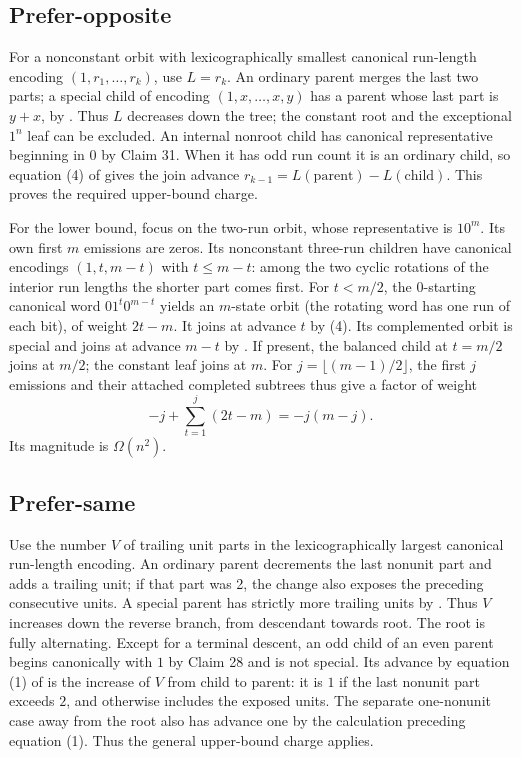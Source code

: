 \documentclass[11pt]{article}
\begin{document}
\subsection{Prefer-opposite}
For a nonconstant orbit with lexicographically smallest
canonical run-length encoding \((1,r_1,\ldots,r_k)\), use
\(L=r_k\). An ordinary parent merges the last two parts;
a special child of encoding \((1,x,\ldots,x,y)\) has a
parent whose last part is \(y+x\), by \cite[Section 11,
Cases 1 and 2]{SalaSawadaAlhakim}. Thus \(L\) decreases down the tree;
the constant root and the exceptional \(1^n\) leaf can be
excluded. An internal nonroot child has canonical representative
beginning in \(0\) by Claim 31. When it has odd run count
it is an ordinary child, so equation (4) of \cite{SalaSawadaAlhakim}
gives the join advance \(r_{k-1}=L(\mathrm{parent})-
L(\mathrm{child})\). This proves the required upper-bound
charge.

For the lower bound, focus on the two-run orbit, whose
representative is \(10^m\). Its own first \(m\) emissions
are zeros. Its nonconstant three-run children have canonical
encodings \((1,t,m-t)\) with \(t\le m-t\): among the two
cyclic rotations of the interior run lengths the shorter
part comes first. For \(t<m/2\), the \(0\)-starting
canonical word \(01^t0^{m-t}\) yields an \(m\)-state
orbit (the rotating word has one run of each bit),
of weight \(2t-m\). It joins at advance \(t\) by (4).
Its complemented orbit is special and joins at advance
\(m-t\) by \cite[Section 11, Case 1]{SalaSawadaAlhakim}. If present,
the balanced child at \(t=m/2\) joins at \(m/2\);
the constant leaf joins at \(m\).
For \(j=\lfloor (m-1)/2\rfloor\), the first \(j\) emissions
and their attached completed subtrees thus give a factor
of weight
\[
 -j+\sum_{t=1}^j(2t-m)=-j(m-j).
\]
Its magnitude is \(\Omega(n^2)\).

\subsection{Prefer-same}
Use the number \(V\) of trailing unit parts in the
lexicographically largest canonical run-length encoding.
An ordinary parent decrements the last nonunit part and
adds a trailing unit; if that part was 2, the change
also exposes the preceding consecutive units. A special
parent has strictly more trailing units by \cite[Section 10,
Case 1]{SalaSawadaAlhakim}. Thus \(V\) increases down the reverse branch,
from descendant towards root. The root is fully
alternating. Except for a terminal descent, an odd child
of an even parent begins canonically with \(1\) by
Claim 28 and is not special. Its advance by equation (1)
of \cite{SalaSawadaAlhakim} is the increase of \(V\) from child to parent:
it is \(1\) if the last nonunit part exceeds \(2\), and
otherwise includes the exposed units. The separate
one-nonunit case away from the root also has advance
one by the calculation preceding equation (1).
Thus the general upper-bound charge applies.
\end{document}
